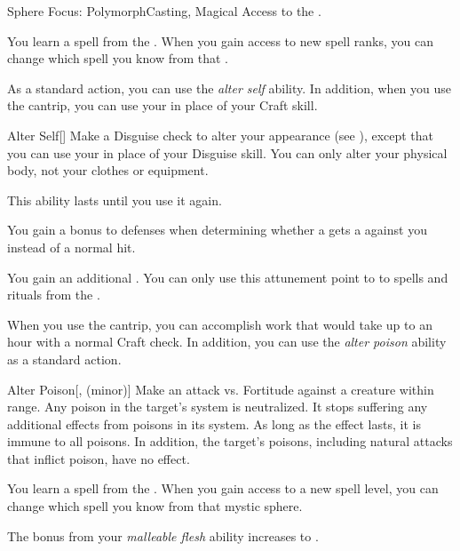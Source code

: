     \begin{feat}{Sphere Focus: Polymorph}{Casting, Magical}
        \featpre Access to the  .

         You learn a spell from the  .
        When you gain access to new spell ranks, you can change which spell you know from that .

         As a standard action, you can use the \textit{alter self} ability.
        In addition, when you use the  cantrip, you can use your  in place of your Craft skill.
        \begin{freeability}{Alter Self}[]
            Make a Disguise check to alter your appearance (see ), except that you can use your  in place of your Disguise skill.
            You can only alter your physical body, not your clothes or equipment.

            This ability lasts until you use it again.
        \end{freeability}

         You gain a  bonus to defenses when determining whether a  gets a  against you instead of a normal hit.

         You gain an additional .
        You can only use this attunement point to  to spells and rituals from the  .

         When you use the  cantrip, you can accomplish work that would take up to an hour with a normal Craft check.
        In addition, you can use the \textit{alter poison} ability as a standard action.
        \begin{freeability}{Alter Poison}[,  (minor)]
            Make an attack vs. Fortitude against a creature within \rngshort range.
            \hit Any poison in the target's system is neutralized.
            It stops suffering any additional effects from poisons in its system.
            As long as the effect lasts, it is immune to all poisons.
            In addition, the target's  poisons, including natural attacks that inflict poison, have no effect.
        \end{freeability}

         You learn a spell from the  .
        When you gain access to a new spell level, you can change which spell you know from that mystic sphere.

         The bonus from your \textit{malleable flesh} ability increases to .
    \end{feat}

